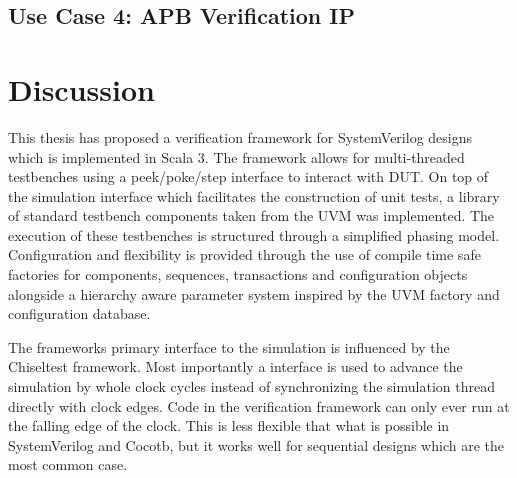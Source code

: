 


\section{Use Case 4: APB Verification IP} %


\cite{didactic}

\chapter{Discussion} %

This thesis has proposed a verification framework for SystemVerilog designs which is implemented in Scala 3. The framework allows for multi-threaded testbenches using a peek/poke/step interface to interact with DUT. On top of the simulation interface which facilitates the construction of unit tests, a library of standard testbench components taken from the UVM was implemented. The execution of these testbenches is structured through a simplified phasing model. Configuration and flexibility is provided through the use of compile time safe factories for components, sequences, transactions and configuration objects alongside a hierarchy aware parameter system inspired by the UVM factory and configuration database.


The frameworks primary interface to the simulation is influenced by the Chiseltest framework. Most importantly a  interface is used to advance the simulation by whole clock cycles instead of synchronizing the simulation thread directly with clock edges. Code in the verification framework can only ever run at the falling edge of the clock. This is less flexible that what is possible in SystemVerilog and Cocotb, but it works well for sequential designs which are the most common case. 

